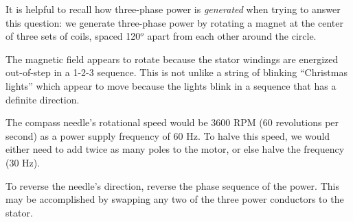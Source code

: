 





It is helpful to recall how three-phase power is {\it generated} when trying to answer this question: we generate three-phase power by rotating a magnet at the center of three sets of coils, spaced 120$^{o}$ apart from each other around the circle.

\vskip 10pt

The magnetic field appears to rotate because the stator windings are energized out-of-step in a 1-2-3 sequence.  This is not unlike a string of blinking ``Christmas lights'' which appear to move because the lights blink in a sequence that has a definite direction.

\vskip 10pt

The compass needle's rotational speed would be 3600 RPM (60 revolutions per second) as a power supply frequency of 60 Hz.  To halve this speed, we would either need to add twice as many poles to the motor, or else halve the frequency (30 Hz).

\vskip 10pt

To reverse the needle's direction, reverse the phase sequence of the power.  This may be accomplished by swapping any two of the three power conductors to the stator.











